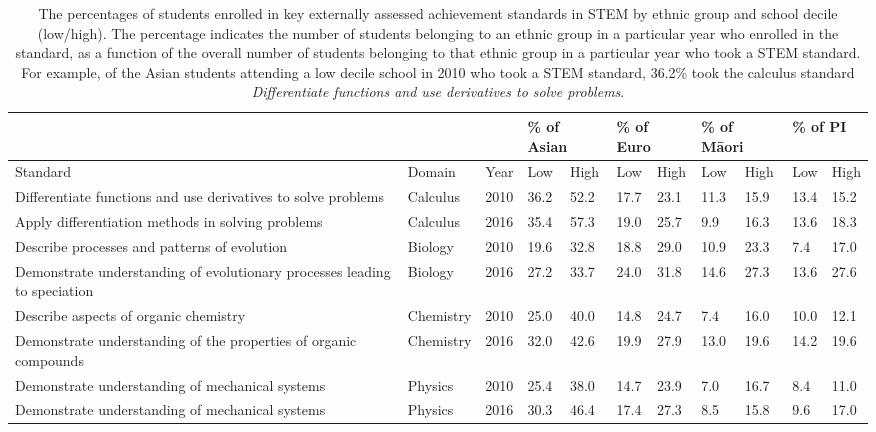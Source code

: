 \begin{landscape}
\begin{table}[h]
\begin{tabular}{lll|l|l|l|l|l|l|l|l|}
\cline{4-11}
          &&& \multicolumn{2}{l|}{\% of Asian} & \multicolumn{2}{l|}{\% of Euro} & \multicolumn{2}{l|}{\% of M\={a}ori}  & \multicolumn{2}{l|}{\% of PI} \\ \hline
\multicolumn{1}{|l|}{Standard} & \multicolumn{1}{l|}{Domain}  & Year & Low & High & Low & High & \multicolumn{1}{l|}{Low} & High & Low & High \\ \hline
\multicolumn{1}{|l|}{Differentiate functions and use derivatives to solve problems} & \multicolumn{1}{l|}{Calculus}  & 2010 & 36.2  & 52.2 & 17.7 & 23.1 & \multicolumn{1}{l|}{11.3} & 15.9 & 13.4 & 15.2 \\
\multicolumn{1}{|l|}{Apply differentiation methods in solving problems} & \multicolumn{1}{l|}{Calculus} & 2016 & 35.4 & 57.3 & 19.0 & 25.7 & \multicolumn{1}{l|}{9.9} & 16.3 & 13.6 & 18.3 \\ \hline
\multicolumn{1}{|l|}{Describe processes and patterns of evolution} & \multicolumn{1}{l|}{Biology} & 2010 & 19.6 & 32.8  & 18.8 & 29.0 & \multicolumn{1}{l|}{10.9} & 23.3 & 7.4 & 17.0 \\
\multicolumn{1}{|l|}{Demonstrate understanding of evolutionary processes leading to speciation} & \multicolumn{1}{l|}{Biology} & 2016 & 27.2 & 33.7 & 24.0 & 31.8 & \multicolumn{1}{l|}{14.6} & 27.3 & 13.6  & 27.6  \\ \hline
\multicolumn{1}{|l|}{Describe aspects of organic chemistry} & \multicolumn{1}{l|}{Chemistry} & 2010 & 25.0 & 40.0 & 14.8 & 24.7 & \multicolumn{1}{l|}{7.4} &16.0 & 10.0 & 12.1 \\
\multicolumn{1}{|l|}{Demonstrate understanding of the properties of organic compounds} & \multicolumn{1}{l|}{Chemistry} & 2016 & 32.0 &42.6 &19.9 &27.9 & \multicolumn{1}{l|}{13.0} & 19.6 &14.2 & 19.6 \\ \hline
\multicolumn{1}{|l|}{Demonstrate understanding of mechanical systems} & \multicolumn{1}{l|}{Physics} & 2010 & 25.4&38.0 &14.7 &23.9 & \multicolumn{1}{l|}{7.0} &16.7 & 8.4&11.0 \\
\multicolumn{1}{|l|}{Demonstrate understanding of mechanical systems} & \multicolumn{1}{l|}{Physics} & 2016 & 30.3&46.4 & 17.4& 27.3& \multicolumn{1}{l|}{8.5} &15.8 &9.6 &17.0 \\ \hline
\end{tabular}
\caption{The percentages of students enrolled in key externally assessed achievement standards in STEM by ethnic group and school decile (low/high). The percentage indicates the number of students belonging to an ethnic group in a particular year who enrolled in the standard, as a function of the overall number of students belonging to that ethnic group in a particular year who took a STEM standard. For example, of the Asian students attending a low decile school in 2010 who took a STEM standard, 36.2\% took the calculus standard \textit{Differentiate functions and use derivatives to solve problems}.  }  \label{table:StdattainmentEthnicityDecile}
\end{table}
\end{landscape}


